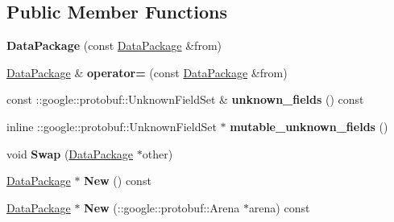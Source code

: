 \subsection*{Public Member Functions}
\begin{DoxyCompactItemize}
\item 
\hypertarget{classstruct_definitions_1_1_data_package_a04902c5cb89a6ceb65b99d853a59a63b}{}\label{classstruct_definitions_1_1_data_package_a04902c5cb89a6ceb65b99d853a59a63b} 
{\bfseries Data\+Package} (const \hyperlink{classstruct_definitions_1_1_data_package}{Data\+Package} \&from)
\item 
\hypertarget{classstruct_definitions_1_1_data_package_a01049ae94005baf78ba9c1bb2d311f59}{}\label{classstruct_definitions_1_1_data_package_a01049ae94005baf78ba9c1bb2d311f59} 
\hyperlink{classstruct_definitions_1_1_data_package}{Data\+Package} \& {\bfseries operator=} (const \hyperlink{classstruct_definitions_1_1_data_package}{Data\+Package} \&from)
\item 
\hypertarget{classstruct_definitions_1_1_data_package_a85b08afe62d8f4bc4d3f349ac5d2aeae}{}\label{classstruct_definitions_1_1_data_package_a85b08afe62d8f4bc4d3f349ac5d2aeae} 
const \+::google\+::protobuf\+::\+Unknown\+Field\+Set \& {\bfseries unknown\+\_\+fields} () const
\item 
\hypertarget{classstruct_definitions_1_1_data_package_a9e1547682c2ea991645a5a749da5a4c4}{}\label{classstruct_definitions_1_1_data_package_a9e1547682c2ea991645a5a749da5a4c4} 
inline \+::google\+::protobuf\+::\+Unknown\+Field\+Set $\ast$ {\bfseries mutable\+\_\+unknown\+\_\+fields} ()
\item 
\hypertarget{classstruct_definitions_1_1_data_package_a2f2e2cbfcea3346081e8979fff4ac550}{}\label{classstruct_definitions_1_1_data_package_a2f2e2cbfcea3346081e8979fff4ac550} 
void {\bfseries Swap} (\hyperlink{classstruct_definitions_1_1_data_package}{Data\+Package} $\ast$other)
\item 
\hypertarget{classstruct_definitions_1_1_data_package_a56ee020f75825de5159b17de80c35cc3}{}\label{classstruct_definitions_1_1_data_package_a56ee020f75825de5159b17de80c35cc3} 
\hyperlink{classstruct_definitions_1_1_data_package}{Data\+Package} $\ast$ {\bfseries New} () const
\item 
\hypertarget{classstruct_definitions_1_1_data_package_a752f697cfd880e7c250da1f6c3cee6ed}{}\label{classstruct_definitions_1_1_data_package_a752f697cfd880e7c250da1f6c3cee6ed} 
\hyperlink{classstruct_definitions_1_1_data_package}{Data\+Package} $\ast$ {\bfseries New} (\+::google\+::protobuf\+::\+Arena $\ast$arena) const

\end{DoxyCompactItemize}
